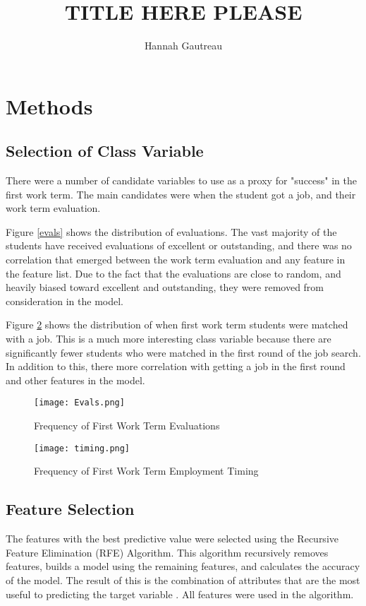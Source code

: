 \documentclass{article}
\begin{document}
\title{TITLE HERE PLEASE} 
\author{Hannah Gautreau}
\date{}
\maketitle

\section{Methods}
\subsection{Selection of Class Variable}
There were a number of candidate variables to use as a proxy for "success" in the first work term. The main candidates were when the student got a job, and their work term evaluation. 

Figure \ref{evals} shows the distribution of evaluations. The vast majority of the students have received evaluations of excellent or outstanding, and there was no correlation that emerged between the work term evaluation and any feature in the feature list. Due to the fact that the evaluations are close to random, and heavily biased toward excellent and outstanding, they were removed from consideration in the model.

Figure \ref{fig:timing} shows the distribution of when first work term students were matched with a job. This is a much more interesting class variable because there are significantly fewer students who were matched in the first round of the job search. In addition to this, there more correlation with getting a job in the first round and other features in the model. 

\begin{figure}[h]
\texttt{[image: Evals.png]}
\caption{Frequency of First Work Term Evaluations}\label{fig:evals}
\centering
\end{figure}

\begin{figure}[h]
\texttt{[image: timing.png]}
\caption{Frequency of First Work Term Employment Timing}\label{fig:timing}
\centering
\end{figure}


\subsection{Feature Selection}
The features with the best predictive value were selected using the Recursive Feature Elimination (RFE) Algorithm. This algorithm recursively removes features, builds a model using the remaining features, and calculates the accuracy of the model. The result of this is the combination of attributes that are the most useful to predicting the target variable \cite{hg:11}. All features were used in the algorithm. 
\end{document}
